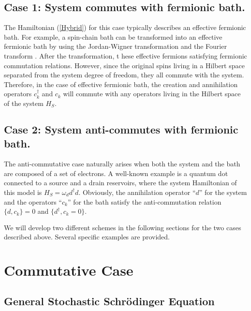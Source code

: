 \documentclass[preprint]{elsarticle}
\begin{document}

\subsection*{Case 1: System commutes with fermionic bath.}

The Hamiltonian (\ref{Hybrid})  for this case typically describes
an effective fermionic bath. For example, a spin-chain
bath can be transformed into an effective fermionic bath by using the
Jordan-Wigner transformation and the Fourier transform \cite{ZhaoFB,Barouch}. After the transformation, t
hese effective fermions satisfying fermionic commutation relations. However, since the original spins living in a Hilbert 
space separated from the system degree of freedom, they all commute with the system.
Therefore, in the case of effective fermionic bath, the creation and annihilation
operators $c_{k}^{\dagger}$ and $c_{k}$ will commute with any operators
living in the Hilbert space of the system $H_{S}$. 

\subsection*{Case 2: System anti-commutes with fermionic bath.}

The anti-commutative case naturally arises when both the system and  the bath  are composed 
of a set of electrons.  A well-known example is a quantum dot connected to a source and a drain reservoirs, where 
the system Hamiltonian of this model is $H_{S}=\omega_{d}d^{\dagger}d$. Obviously, the annihilation
operator ``$d$'' for the system and the operators ``$c_{k}$'' for
the bath satisfy the anti-commutation relation $\{d,c_{k}\}=0$ and $\{d^\dagger,c_{k}=0\}$. 

We will develop two different schemes in the following sections  for the two cases described above. Several specific examples
are provided.


\section{\label{sec:III} Commutative Case}


\subsection{\label{sub:IIIA}General Stochastic Schr\"odinger Equation}
\end{document}
